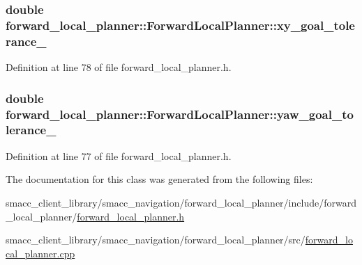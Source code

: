 \subsubsection[{\texorpdfstring{xy\+\_\+goal\+\_\+tolerance\+\_\+}{xy_goal_tolerance_}}]{\setlength{\rightskip}{0pt plus 5cm}double forward\+\_\+local\+\_\+planner\+::\+Forward\+Local\+Planner\+::xy\+\_\+goal\+\_\+tolerance\+\_\+\hspace{0.3cm}{\ttfamily [private]}}\hypertarget{classforward__local__planner_1_1ForwardLocalPlanner_a7b8d0133662354613ee30db8571fc380}{}\label{classforward__local__planner_1_1ForwardLocalPlanner_a7b8d0133662354613ee30db8571fc380}


Definition at line 78 of file forward\+\_\+local\+\_\+planner.\+h.

\subsubsection[{\texorpdfstring{yaw\+\_\+goal\+\_\+tolerance\+\_\+}{yaw_goal_tolerance_}}]{\setlength{\rightskip}{0pt plus 5cm}double forward\+\_\+local\+\_\+planner\+::\+Forward\+Local\+Planner\+::yaw\+\_\+goal\+\_\+tolerance\+\_\+\hspace{0.3cm}{\ttfamily [private]}}\hypertarget{classforward__local__planner_1_1ForwardLocalPlanner_a078a55bb035682cf8e484ecf9519004d}{}\label{classforward__local__planner_1_1ForwardLocalPlanner_a078a55bb035682cf8e484ecf9519004d}


Definition at line 77 of file forward\+\_\+local\+\_\+planner.\+h.



The documentation for this class was generated from the following files\+:\begin{DoxyCompactItemize}
\item 
smacc\+\_\+client\+\_\+library/smacc\+\_\+navigation/forward\+\_\+local\+\_\+planner/include/forward\+\_\+local\+\_\+planner/\hyperlink{forward__local__planner_8h}{forward\+\_\+local\+\_\+planner.\+h}\item 
smacc\+\_\+client\+\_\+library/smacc\+\_\+navigation/forward\+\_\+local\+\_\+planner/src/\hyperlink{forward__local__planner_8cpp}{forward\+\_\+local\+\_\+planner.\+cpp}\end{DoxyCompactItemize}
